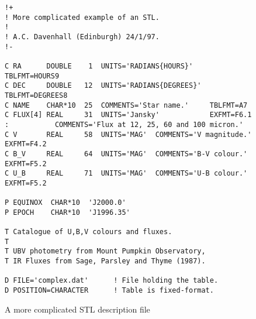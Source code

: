 \documentclass[twoside,11pt]{article}
\renewcommand{\_}{\texttt{\symbol{95}}}
\begin{document}
\begin{figure}[htbp]


\begin{verbatim}
!+
! More complicated example of an STL.
!
! A.C. Davenhall (Edinburgh) 24/1/97.
!-

C RA      DOUBLE    1  UNITS='RADIANS{HOURS}'    TBLFMT=HOURS9
C DEC     DOUBLE   12  UNITS='RADIANS{DEGREES}'  TBLFMT=DEGREES8
C NAME    CHAR*10  25  COMMENTS='Star name.'     TBLFMT=A7
C FLUX[4] REAL     31  UNITS='Jansky'            EXFMT=F6.1
:           COMMENTS='Flux at 12, 25, 60 and 100 micron.'
C V       REAL     58  UNITS='MAG'  COMMENTS='V magnitude.' EXFMT=F4.2
C B_V     REAL     64  UNITS='MAG'  COMMENTS='B-V colour.'  EXFMT=F5.2
C U_B     REAL     71  UNITS='MAG'  COMMENTS='U-B colour.'  EXFMT=F5.2

P EQUINOX  CHAR*10  'J2000.0'
P EPOCH    CHAR*10  'J1996.35'

T Catalogue of U,B,V colours and fluxes.
T
T UBV photometry from Mount Pumpkin Observatory,
T IR Fluxes from Sage, Parsley and Thyme (1987).

D FILE='complex.dat'      ! File holding the table.
D POSITION=CHARACTER      ! Table is fixed-format.
\end{verbatim}

\caption{A more complicated STL description file\label{DESCR_COMP} }

\end{figure}
\end{document}
